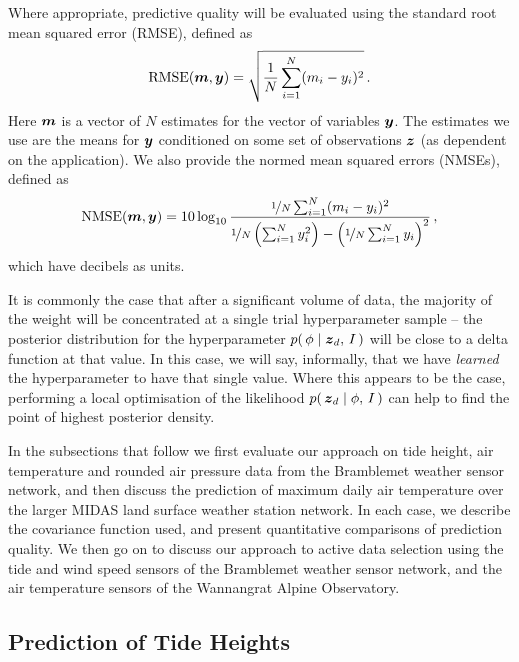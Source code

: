 \documentclass{acmtrans2m}
\begin{document}
Where appropriate, predictive quality will be evaluated using the standard root mean squared error (RMSE), defined as
\begin{equation*}
 \text{RMSE}(\boldsymbol{m},\boldsymbol{y}) = \sqrt{\frac{1}{N}\sum_{i=1}^N (m_i-y_i)^2}\,.
\end{equation*}
Here $\boldsymbol{m}$ is a vector of $N$ estimates for the vector of variables $\boldsymbol{y}$. The estimates we use are the means for $\boldsymbol{y}$ conditioned on some set of observations $\boldsymbol{z}$ (as dependent on the application). We also provide the normed mean squared errors (NMSEs), defined as
\begin{equation*}
 \text{NMSE}(\boldsymbol{m},\boldsymbol{y}) = 10 \log_{10} \frac{\nicefrac{1}{N} \sum_{i= 1}^{N} (m_i - y_i)^2 }{\nicefrac{1}{N} \left(\sum_{i = 1}^{N} y_i^2\right) - \left(\nicefrac{1}{N} \sum_{i = 1}^{N} y_i\right)^2 }\,,
\end{equation*}
which have decibels as units.

It is commonly the case that after a significant volume of data, the majority of the weight will be concentrated at a single trial hyperparameter sample -- the posterior distribution for the hyperparameter $p\!\left(\,\phi\mid\boldsymbol{z}_d,\,I\,\right)$ will be close to a delta function at that value. In this case, we will say, informally, that we have \emph{learned} the hyperparameter to have that single value. Where this appears to be the case, performing a local optimisation of the likelihood $p\!\left(\,\boldsymbol{z}_d\mid\phi,\,I\,\right)$ can help to find the point of highest posterior density.

In the subsections that follow we first evaluate our approach on tide height, air temperature and rounded air pressure data from the Bramblemet weather sensor network, and then discuss the prediction of maximum daily air temperature over the larger MIDAS land surface weather station network. In each case, we describe the covariance function used, and present quantitative comparisons of prediction quality. We then go on to discuss our approach to active data selection using the tide and wind speed sensors of the Bramblemet weather sensor network, and the air temperature sensors of the Wannangrat Alpine Observatory.

\subsection{Prediction of Tide Heights} \label{sec:tide_pred}
\end{document}
